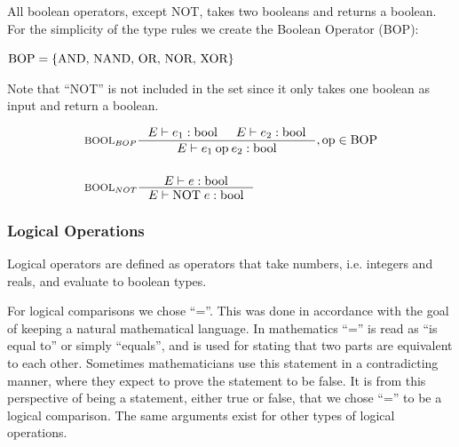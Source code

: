 All boolean operators, except NOT, takes two booleans and returns a boolean. For the simplicity of the type rules we create the Boolean Operator (BOP):

\begin{center}
$\text{BOP} = \left\{ {\text{AND, NAND, OR, NOR, XOR}} \right\}$
\end{center}

Note that \enquote{NOT} is not included in the set since it only takes one boolean as input and return a boolean.

\begin{align*}
&\inference[$\text{BOOL}_{BOP}$]{\Tenv e_1 : \Tbool &
                       \Tenv e_2 : \Tbool}
                    {\Tenv e_1 \mathbin{\text{op}} e_2 : \Tbool}, \text{op} \in \Tbop
\\\\
&\inference[$\text{BOOL}_{NOT}$]{\Tenv e : \Tbool}
                    {\Tenv \mathbin{\text{NOT}} \; e : \Tbool}
\end{align*}


\subsubsection{Logical Operations}
\label{sec:logicOps}

Logical operators are defined as operators that take numbers, i.e. integers and reals, and evaluate to boolean types.

For logical comparisons we chose \enquote{=}. This was done in accordance with the goal of keeping a natural mathematical language. In mathematics \enquote{=} is read as \enquote{is equal to} or simply \enquote{equals}, and is used for stating that two parts are equivalent to each other. Sometimes mathematicians use this statement in a contradicting manner, where they expect to prove the statement to be false. It is from this perspective of being a statement, either true or false, that we chose \enquote{=} to be a logical comparison. The same arguments exist for other types of logical operations.

